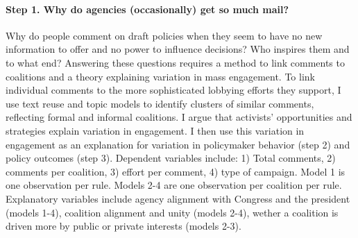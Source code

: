 \paragraph{Step 1. Why do agencies (occasionally) get so much mail?} %
Why do people comment on draft policies when they seem to have no new information to offer and no power to influence decisions? Who inspires them and to what end? 
Answering these questions requires a method to link comments to coalitions and a theory explaining variation in mass engagement.  
To link individual comments to the more sophisticated lobbying efforts they support, I use text reuse and topic models to identify clusters of similar comments, reflecting formal and informal coalitions.
I argue that activists' opportunities and strategies explain variation in engagement. %
I then use this variation in engagement as an explanation for variation in policymaker behavior (step 2) and policy outcomes (step 3). 
Dependent variables include: 
1) Total comments, %
2) comments per coalition, %
3) effort per comment, %
4) type of campaign. %
Model 1 is one observation per rule. Models 2-4 are one observation per coalition per rule. Explanatory variables include agency alignment with Congress and the president (models 1-4), coalition alignment and unity (models 2-4), wether a coalition is driven more by public or private interests (models 2-3).%


